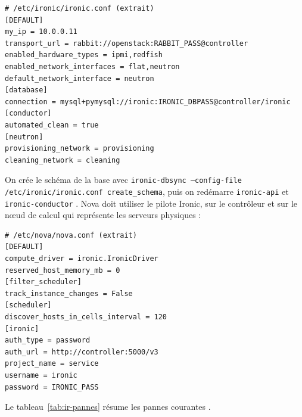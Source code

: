 \par\noindent\begin{minipage}{\linewidth}
\begin{lstlisting}
# /etc/ironic/ironic.conf (extrait)
[DEFAULT]
my_ip = 10.0.0.11
transport_url = rabbit://openstack:RABBIT_PASS@controller
enabled_hardware_types = ipmi,redfish
enabled_network_interfaces = flat,neutron
default_network_interface = neutron
[database]
connection = mysql+pymysql://ironic:IRONIC_DBPASS@controller/ironic
[conductor]
automated_clean = true
[neutron]
provisioning_network = provisioning
cleaning_network = cleaning
\end{lstlisting}
\end{minipage}\par

On crée le schéma de la base avec \texttt{ironic-dbsync --config-file /etc/ironic/ironic.conf create\_\allowbreak schema}, puis on
redémarre \texttt{ironic-api} et \texttt{ironic-conductor} \parencite{ironic-install}. Nova doit utiliser le pilote Ironic, sur
le contrôleur et sur le nœud de calcul qui représente les serveurs physiques \parencite{ironic-nova-compute} :

\par\noindent\begin{minipage}{\linewidth}
\begin{lstlisting}
# /etc/nova/nova.conf (extrait)
[DEFAULT]
compute_driver = ironic.IronicDriver
reserved_host_memory_mb = 0
[filter_scheduler]
track_instance_changes = False
[scheduler]
discover_hosts_in_cells_interval = 120
[ironic]
auth_type = password
auth_url = http://controller:5000/v3
project_name = service
username = ironic
password = IRONIC_PASS
\end{lstlisting}
\end{minipage}\par

Le tableau~\ref{tab:ir-pannes} résume les pannes courantes \parencite{ironic-troubleshooting,ironic-troubleshooting-install}.

